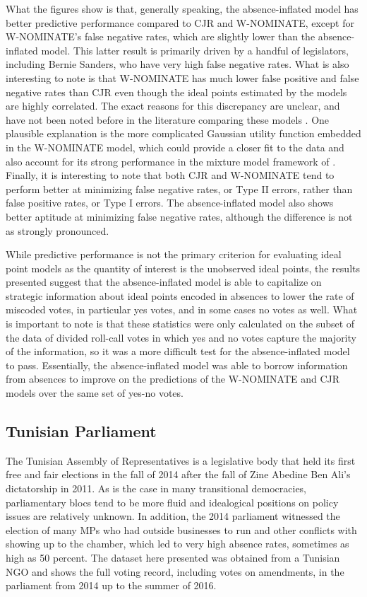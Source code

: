 What the figures show is that, generally speaking, the absence-inflated model has better predictive performance compared to CJR and W-NOMINATE, except for W-NOMINATE's false negative rates, which are slightly lower than the absence-inflated model. This latter result is primarily driven by a handful of legislators, including Bernie Sanders, who have very high false negative rates. What is also interesting to note is that W-NOMINATE has much lower false positive and false negative rates than CJR even though the ideal points estimated by the models are highly correlated. The exact reasons for this discrepancy are unclear, and have not been noted before in the literature comparing these models \parencite{carroll2009,jackman2004,carroll2013}. One plausible explanation is the more complicated Gaussian utility function embedded in the W-NOMINATE model, which could provide a closer fit to the data and also account for its strong performance in the mixture model framework of \textcite{carroll2013}. Finally, it is interesting to note that both CJR and W-NOMINATE tend to perform better at minimizing false negative rates, or Type II errors, rather than false positive rates, or Type I errors. The absence-inflated model also shows better aptitude at minimizing false negative rates, although the difference is not as strongly pronounced.

While predictive performance is not the primary criterion for evaluating ideal point models as the quantity of interest is the unobserved ideal points, the results presented suggest that the absence-inflated model is able to capitalize on strategic information about ideal points encoded in absences to lower the rate of miscoded votes, in particular yes votes, and in some cases no votes as well. What is important to note is that these statistics were only calculated on the subset of the data of divided roll-call votes in which yes and no votes capture the majority of the information, so it was a more difficult test for the absence-inflated model to pass. Essentially, the absence-inflated model was able to borrow information from absences to improve on the predictions of the W-NOMINATE and CJR models over the same set of yes-no votes.




	
	\subsection{Tunisian Parliament}
	
	The Tunisian Assembly of Representatives is a legislative body that held its first free and fair elections in the fall of 2014 after the fall of Zine Abedine Ben Ali's dictatorship in 2011. As is the case in many transitional democracies, parliamentary blocs tend to be more fluid and idealogical positions on policy issues are relatively unknown. In addition, the 2014 parliament witnessed the election of many MPs who had outside businesses to run and other conflicts with showing up to the chamber, which led to very high absence rates, sometimes as high as 50 percent. The dataset here presented was obtained from a Tunisian NGO and shows the full voting record, including votes on amendments, in the parliament from 2014 up to the summer of 2016. 
	
